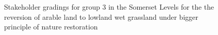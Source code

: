 \documentclass[
  12pt,
  letterpaper,
  DIV=11,
  numbers=noendperiod]{scrartcl}
\begin{document}
\begin{figure}[H]


\caption{\label{fig-SomArBigG3}Stakeholder gradings for group 3 in the
Somerset Levels for the the reversion of arable land to lowland wet
grassland under bigger principle of nature restoration}

\end{figure}%
\end{document}
